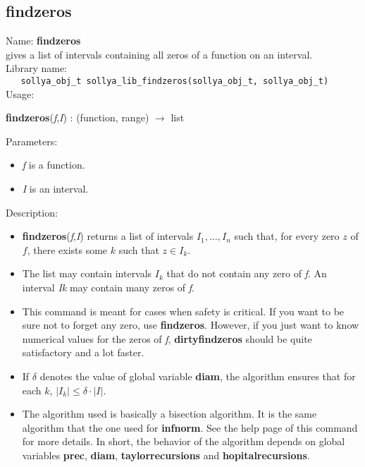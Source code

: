 \subsection{findzeros}
\label{labfindzeros}
\noindent Name: \textbf{findzeros}\\
\phantom{aaa}gives a list of intervals containing all zeros of a function on an interval.\\[0.2cm]
\noindent Library name:\\
\verb|   sollya_obj_t sollya_lib_findzeros(sollya_obj_t, sollya_obj_t)|\\[0.2cm]
\noindent Usage: 
\begin{center}
\textbf{findzeros}(\emph{f},\emph{I}) : (\textsf{function}, \textsf{range}) $\rightarrow$ \textsf{list}\\
\end{center}
Parameters: 
\begin{itemize}
\item \emph{f} is a function.
\item \emph{I} is an interval.
\end{itemize}
\noindent Description: \begin{itemize}

\item \textbf{findzeros}(\emph{f},\emph{I}) returns a list of intervals $I_1, \dots, I_n$ such that, for 
   every zero $z$ of $f$, there exists some $k$ such that $z \in I_k$.

\item The list may contain intervals $I_k$ that do not contain any zero of \emph{f}.
   An interval \emph{Ik} may contain many zeros of \emph{f}.

\item This command is meant for cases when safety is critical. If you want to be sure
   not to forget any zero, use \textbf{findzeros}. However, if you just want to know 
   numerical values for the zeros of \emph{f}, \textbf{dirtyfindzeros} should be quite 
   satisfactory and a lot faster.

\item If $\delta$ denotes the value of global variable \textbf{diam}, the algorithm ensures
   that for each $k$, $|I_k| \le \delta \cdot |I|$.

\item The algorithm used is basically a bisection algorithm. It is the same algorithm
   that the one used for \textbf{infnorm}. See the help page of this command for more 
   details. In short, the behavior of the algorithm depends on global variables
   \textbf{prec}, \textbf{diam}, \textbf{taylorrecursions} and \textbf{hopitalrecursions}.
\end{itemize}

